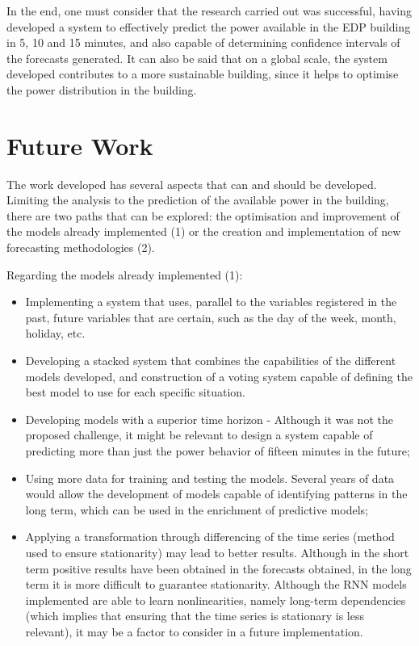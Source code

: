 In the end, one must consider that the research carried out was successful, having developed a system to effectively predict the power available in the \ac{EDP} building in 5, 10 and 15 minutes, and also capable of determining confidence intervals of the forecasts generated. It can also be said that on a global scale, the system developed contributes to a more sustainable building, since it helps to optimise the power distribution in the building.



\newpage
\section{Future Work}

The work developed has several aspects that can and should be developed. Limiting the analysis to the prediction of the available power in the building, there are two paths that can be explored: the optimisation and improvement of the models already implemented (1) or the creation and implementation of new forecasting methodologies (2). 

Regarding the models already implemented (1):   

\begin{itemize}
\setlength\itemsep{0.1em}
    \item Implementing a system that uses, parallel to the variables registered in the past, future variables that are certain, such as the day of the week, month, holiday, etc.
    \item Developing a stacked system that combines the capabilities of the different models developed, and construction of a voting system capable of defining the best model to use for each specific situation.
    \item Developing models with a superior time horizon - Although it was not the proposed challenge, it might be relevant to design a system capable of predicting more than just the power behavior of fifteen minutes in the future;
    \item Using more data for training and testing the models. Several years of data would allow the development of models capable of identifying patterns in the long term, which can be used in the enrichment of predictive models;
    \item Applying a transformation through differencing  of the time series (method used to ensure stationarity) may lead to better results. Although in the short term positive results have been obtained in the forecasts obtained, in the long term it is more difficult to guarantee stationarity. Although the \ac{RNN} models implemented are able to learn nonlinearities, namely long-term dependencies (which implies that ensuring that the time series is stationary is less relevant), it may be a factor to consider in a future implementation.
\end{itemize}

